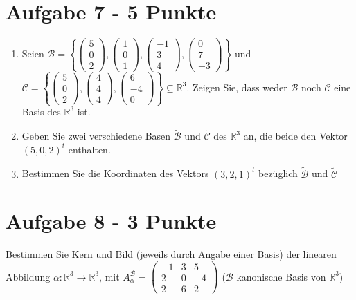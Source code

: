 \section*{Aufgabe 7 - 5 Punkte}
  \begin{enumerate}[label=\alph*)]
    \item Seien $\mathcal{B} = \left \lbrace
      \begin{pmatrix} 5\\0\\2\end{pmatrix},
      \begin{pmatrix} 1\\0\\1\end{pmatrix},
      \begin{pmatrix} -1\\3\\4\end{pmatrix},
      \begin{pmatrix} 0\\7\\-3\end{pmatrix}
      \right \rbrace$ und $\mathcal{C}= \left \lbrace
      \begin{pmatrix} 5\\0\\2\end{pmatrix},
      \begin{pmatrix} 4\\4\\4\end{pmatrix},
      \begin{pmatrix} 6\\-4\\0\end{pmatrix}
      \right \rbrace \subseteq \mathbb{R}^3$. Zeigen Sie, dass weder $\mathcal{B}$ noch $\mathcal{C}$ eine Basis des $\mathbb{R}^3$ ist.
          \item Geben Sie zwei verschiedene Basen  $\tilde{ \mathcal{B}}$ und  $\tilde{ \mathcal{C}}$ des $\mathbb{R}^3$ an, die beide den Vektor $(5,0,2)^t$ enthalten.
          \item Bestimmen Sie die Koordinaten des Vektors $(3,2,1)^t$ bezüglich
       $\tilde{ \mathcal{B}}$ und  $\tilde{ \mathcal{C}}$
  \end{enumerate}
\section*{Aufgabe 8 - 3 Punkte}
Bestimmen Sie Kern und Bild (jeweils durch Angabe einer Basis) der linearen Abbildung $\alpha : \mathbb{R}^3 \rightarrow \mathbb{R}^3$, mit
 $A_{\alpha}^{\mathcal{B}} = \begin{pmatrix} -1 &3&5\\2&0&-4\\2&6&2\end{pmatrix}$ ($\mathcal{B}$ kanonische Basis von $\mathbb{R}^3$)
